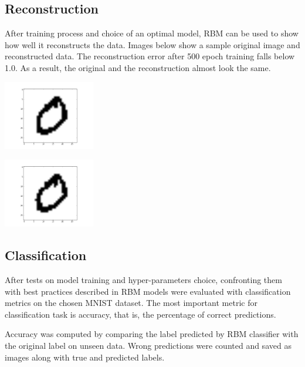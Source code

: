 \documentclass[a4paper]{scrartcl}
\begin{document}
\subsection{Reconstruction}
After training process and choice of an optimal model, RBM can be used to show how well it reconstructs the data. Images below show a sample original image and reconstructed data. The reconstruction error after 500 epoch training falls below 1.0. As a result, the original and the reconstruction almost look the same.
\par
\begin{minipage}[t]{0.5\textwidth}
\begin{center}
\includegraphics[width=4cm]{images/0original.png}
\end{center}
\end{minipage}
\begin{minipage}[t]{0.5\textwidth}
\begin{center}
\includegraphics[width=4cm]{images/0_reconstructed_momentum00.png}
\end{center}
\end{minipage}
\subsection{Classification}
After tests on model training and hyper-parameters choice, confronting them with best practices described in \cite{Hinton} RBM models were evaluated with classification metrics on the chosen MNIST dataset. The most important metric for classification task is accuracy, that is, the percentage of correct predictions. 
\par Accuracy was computed by comparing the label predicted by RBM classifier with the original label on unseen data. Wrong predictions were counted and saved as images along with true and predicted labels.
\end{document}
